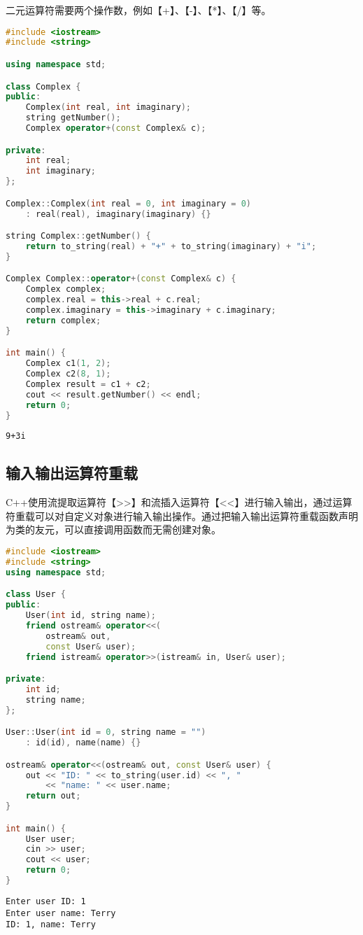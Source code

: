 二元运算符需要两个操作数，例如【+】、【-】、【*】、【/】等。\\


\begin{lstlisting}[language=C++]
#include <iostream>
#include <string>

using namespace std;

class Complex {
public:
    Complex(int real, int imaginary);
    string getNumber();
    Complex operator+(const Complex& c);

private:
    int real;
    int imaginary;
};

Complex::Complex(int real = 0, int imaginary = 0)
    : real(real), imaginary(imaginary) {}

string Complex::getNumber() {
    return to_string(real) + "+" + to_string(imaginary) + "i";
}

Complex Complex::operator+(const Complex& c) {
    Complex complex;
    complex.real = this->real + c.real;
    complex.imaginary = this->imaginary + c.imaginary;
    return complex;
}

int main() {
    Complex c1(1, 2);
    Complex c2(8, 1);
    Complex result = c1 + c2;
    cout << result.getNumber() << endl;
    return 0;
}
\end{lstlisting}

\begin{tcolorbox}
	\begin{verbatim}
9+3i
	\end{verbatim}
\end{tcolorbox}

\vspace{0.5cm}

\subsection{输入输出运算符重载}

C++使用流提取运算符【>>】和流插入运算符【<<】进行输入输出，通过运算符重载可以对自定义对象进行输入输出操作。通过把输入输出运算符重载函数声明为类的友元，可以直接调用函数而无需创建对象。\\


\begin{lstlisting}[language=C++]
#include <iostream>
#include <string>
using namespace std;

class User {
public:
    User(int id, string name);
    friend ostream& operator<<(
        ostream& out,
        const User& user);
    friend istream& operator>>(istream& in, User& user);

private:
    int id;
    string name;
};

User::User(int id = 0, string name = "")
    : id(id), name(name) {}

ostream& operator<<(ostream& out, const User& user) {
    out << "ID: " << to_string(user.id) << ", "
        << "name: " << user.name;
    return out;
}

int main() {
    User user;
    cin >> user;
    cout << user;
    return 0;
}
\end{lstlisting}

\begin{tcolorbox}
	\begin{verbatim}
Enter user ID: 1
Enter user name: Terry
ID: 1, name: Terry
	\end{verbatim}
\end{tcolorbox}

\newpage